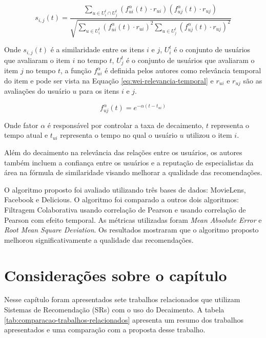 \begin{equation}
  \label{eq:wei-similaridade}
  s_{i,j}(t) = \frac{\sum_{u \in U_i^t \cap U_j^t}{(f_{ui}^\alpha(t) \cdot r_{ui})(f_{uj}^\alpha(t) \cdot r_{uj})}}{\sqrt{\sum_{u \in U_i^t}{(f_{ui}^\alpha(t) \cdot r_{ui})}^2 \sum_{u \in U_j^t}{(f_{uj}^\alpha(t) \cdot r_{uj})}^2}}
\end{equation}

Onde $s_{i,j}(t)$ é a similaridade entre os itens $i$ e $j$, $U_i^t$ é o conjunto de usuários que avaliaram o item $i$ no
tempo $t$, $U_j^t$ é o conjunto de usuários que avaliaram o item $j$ no tempo $t$, a função $f_{ui}^\alpha$ é definida
pelos autores como relevância temporal do item e pode ser vista na Equação \ref{eq:wei-relevancia-temporal} e $r_{ui}$ e
$r_{uj}$ são as avaliações do usuário $u$ para os itens $i$ e $j$.


\begin{equation}
  \label{eq:wei-relevancia-temporal}
  f_{uj}^\alpha(t) = e^{- \alpha (t - t_{ui})}
\end{equation}

Onde fator $\alpha$ é responsável por controlar a taxa de decaimento, $t$ representa o tempo atual e $t_{ui}$ representa
o tempo no qual o usuário $u$ utilizou o item $i$.

Além do decaimento na relevância das relações entre os usuários, os autores também incluem a confiança entre os
usuários e a reputação de especialistas da área na fórmula de similaridade visando melhorar a qualidade das
recomendações.

O algoritmo proposto foi avaliado utilizando três bases de dados: MovieLens, Facebook e Delicious. O algoritmo foi
comparado a outros dois algoritmos: Filtragem Colaborativa usando correlação de Pearson e usando correlação de Pearson
com efeito temporal. As métricas utilizadas foram \textit{Mean Absolute Error} e \textit{Root Mean Square Deviation}.
Os resultados mostraram que o algoritmo proposto melhorou significativamente a qualidade das recomendações.

\section{Considerações sobre o capítulo}

Nesse capítulo foram apresentados sete trabalhos relacionados que utilizam Sistemas de Recomendação (SRs) com o uso do
Decaimento. A tabela \ref{tab:comparacao-trabalhos-relacionados} apresenta um resumo dos trabalhos apresentados e uma comparação com
a proposta desse trabalho.

